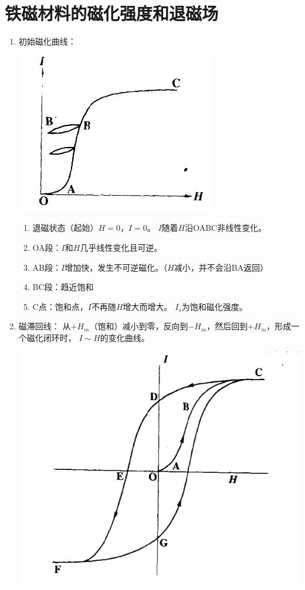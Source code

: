 \section{铁磁材料的磁化强度和退磁场}
\begin{enumerate}
    \item 初始磁化曲线：
    \begin{center}
        \includegraphics[scale=0.8]{images/1_2.png}
    \end{center}
    \begin{enumerate}
        \item 退磁状态（起始）$H=0$，$I=0$。
        $I$随着$H$沿OABC非线性变化。
        \item OA段：$I$和$H$几乎线性变化且可逆。
        \item AB段：$I$增加快，发生不可逆磁化。（$H$减小，并不会沿BA返回）
        \item BC段：趋近饱和
        \item C点：饱和点，$I$不再随$H$增大而增大。
            $I_s$为饱和磁化强度。
    \end{enumerate}
    \item 磁滞回线：
    从$+H_m$（饱和）减小到零，反向到$-H_m$，然后回到$+H_m$，形成一个磁化闭环时，
    $I \sim H$的变化曲线。
    \begin{center}
        \includegraphics[scale=0.5]{images/1_1.png}

\end{center}
\end{enumerate}
